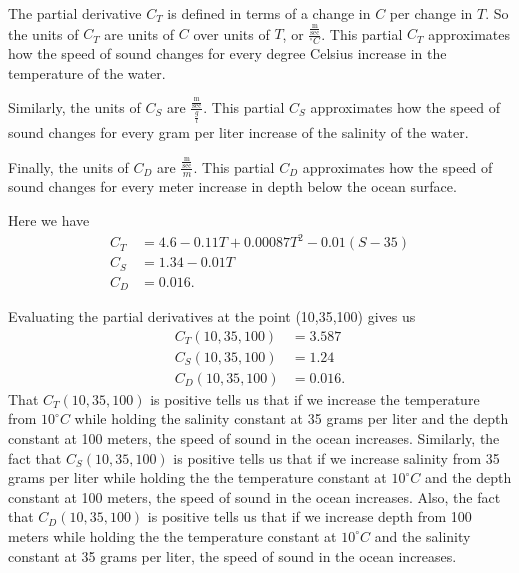 \begin{activitySolution}
\ba
\item The partial derivative $C_T$ is defined in terms of a change in $C$ per change in $T$. So the units of $C_T$ are units of $C$ over units of $T$, or $\frac{\frac{\text{m}}{\text{sec}}}{^{\circ}C}$. This partial $C_T$ approximates how the speed of sound changes for every degree Celsius increase in the temperature of the water.

Similarly, the units of $C_S$ are $\frac{\frac{\text{m}}{\text{sec}}}{\frac{g}{l}}$. This partial $C_S$ approximates how the speed of sound changes for every gram per liter increase of the salinity of the water.

Finally, the units of $C_D$ are $\frac{\frac{\text{m}}{\text{sec}}}{m}$. This partial $C_D$ approximates how the speed of sound changes for every meter increase in depth below the ocean surface. 
\item Here we have 
\begin{align*}
C_T &= 4.6-0.11T+0.00087T^2-0.01(S-35) \\
C_S &= 1.34-0.01T \\
C_D &= 0.016.
\end{align*}
\item Evaluating the partial derivatives at the point (10,35,100) gives us 
\begin{align*}
C_T(10,35,100) &= 3.587 \\
C_S(10,35,100) &= 1.24 \\
C_D(10,35,100) &= 0.016.
\end{align*}
That $C_T(10,35,100)$ is positive tells us that if we increase the temperature from $10^{\circ}C$ while holding the salinity constant at 35 grams per liter and the depth constant at 100 meters, the speed of sound in the ocean increases. Similarly, the fact that $C_S(10,35,100)$ is positive tells us that if we increase salinity from 35 grams per liter while holding the the temperature constant at $10^{\circ}C$ and the depth constant at 100 meters, the speed of sound in the ocean increases. Also, the fact that $C_D(10,35,100)$ is positive tells us that if we increase depth from 100 meters while holding the the temperature constant at $10^{\circ}C$ and the salinity constant at 35 grams per liter, the speed of sound in the ocean increases. 
\ea
\end{activitySolution}

\aftera
